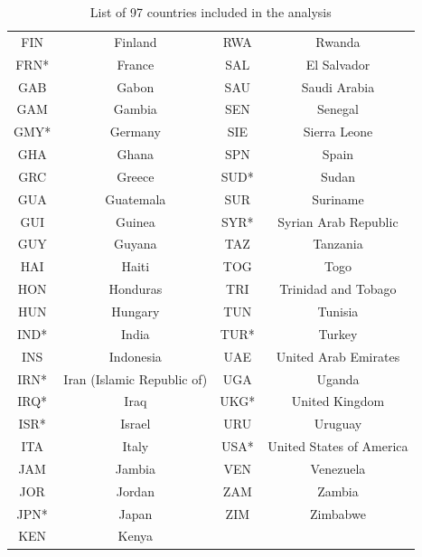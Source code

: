 \documentclass[a4paper]{article}
\begin{document}
\begin{table}[H]
\begin{tabular}{c|c||c|c}
				FIN & Finland	&RWA & Rwanda\\
			FRN* & France&SAL & El Salvador\\
			GAB & Gabon 	&SAU & Saudi Arabia\\
			GAM & Gambia	&SEN &Senegal \\
				GMY* & Germany& SIE&Sierra Leone \\
			 	GHA & Ghana	&SPN & Spain\\
			GRC & Greece&SUD* &Sudan \\
				GUA & Guatemala &SUR&Suriname\\
				GUI &Guinea&SYR* & Syrian Arab Republic\\
		GUY & Guyana	&TAZ & Tanzania\\
				HAI & Haiti  &TOG & Togo\\
					HON &Honduras&TRI & Trinidad and Tobago\\
			HUN & Hungary 	&TUN & Tunisia\\
				IND* & India&TUR*& Turkey\\
			INS & Indonesia		&UAE & United Arab Emirates\\
	IRN* & Iran (Islamic Republic of)		& UGA & Uganda\\
			IRQ* & Iraq &UKG* & United Kingdom\\
				ISR* & Israel&URU & Uruguay\\
			ITA & Italy		&USA* & United States of America\\
		JAM& Jambia	&VEN & Venezuela\\
			JOR & Jordan	&ZAM & Zambia\\
			JPN* & Japan	&ZIM & Zimbabwe\\		
				KEN & Kenya&&\\
				\hline
\end{tabular}
	\label{table:importantvotes}
	\caption {List of 97 countries included in the analysis}
\end{table}
\end{document}
